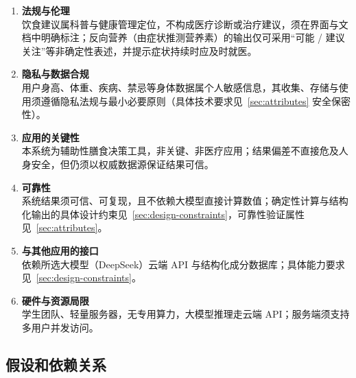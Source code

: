 \documentclass[12pt,a4paper]{ctexart}
\begin{document}
\begin{enumerate}
\item \textbf{法规与伦理}\\
  饮食建议属科普与健康管理定位，不构成医疗诊断或治疗建议，须在界面与文档中明确标注；反向营养（由症状推测营养素）的输出仅可采用“可能 / 建议关注”等非确定性表述，并提示症状持续时应及时就医。
\item \textbf{隐私与数据合规}\\
  用户身高、体重、疾病、禁忌等身体数据属个人敏感信息，其收集、存储与使用须遵循隐私法规与最小必要原则（具体技术要求见~\ref{sec:attributes} 安全保密性）。
\item \textbf{应用的关键性} \\
  本系统为辅助性膳食决策工具，非关键、非医疗应用；结果偏差不直接危及人身安全，但仍须以权威数据源保证结果可信。
\item \textbf{可靠性} \\
  系统结果须可信、可复现，且不依赖大模型直接计算数值；确定性计算与结构化输出的具体设计约束见~\ref{sec:design-constraints}，可靠性验证属性见~\ref{sec:attributes}。
\item \textbf{与其他应用的接口} \\
  依赖所选大模型（DeepSeek）云端 API 与结构化成分数据库；具体能力要求见~\ref{sec:design-constraints}。
\item \textbf{硬件与资源局限} \\
  学生团队、轻量服务器，无专用算力，大模型推理走云端 API；服务端须支持多用户并发访问。
\end{enumerate}

\subsection{假设和依赖关系}
\end{document}
